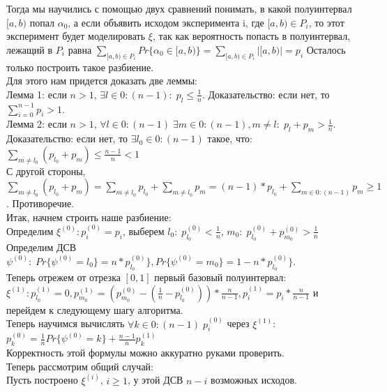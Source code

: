 Тогда мы научились с помощью двух сравнений понимать, в какой полуинтервал $[a, b)$ попал $\alpha_0$, а если объявить исходом эксперимента i, где $[a, b) \in P_i$, то этот эксперимент будет моделировать $\xi$, так как вероятность попасть в полуинтервал, лежащий в $P_i$ равна $\sum\limits_{[a, b) \in P_i}Pr\{\alpha_0 \in [a, b)\} = \sum\limits_{[a, b) \in P_i}|[a, b)| = p_i$ Осталось только построить такое разбиение.\\
Для этого нам придется доказать две леммы:\\
Лемма 1: если $n > 1$, $\exists l \in 0:(n - 1): \; p_l \leq \frac{1}{n}$. Доказательство: если нет, то $\sum\limits_{i = 0}^{n - 1} p_i > 1$.\\
Лемма 2: если $n > 1$, $\forall l \in 0:(n - 1) \; \exists m \in 0:(n - 1), m \not= l : \; p_l + p_m > \frac{1}{n}$. Доказательство: если нет, то $\exists l_0 \in 0:(n - 1)$ такое, что:\\
$\sum\limits_{m \not= l_0} (p_{l_0} + p_m) \leq \frac{n - 1}{n} < 1$\\
С другой стороны, $\sum\limits_{m \not= l_0} (p_{l_0} + p_m) = \sum\limits_{m \not= l_0} p_{l_0} + \sum\limits_{m \not= l_0}p_m = (n - 1) * p_{l_0} + \sum\limits_{m \in 0:(n - 1)}p_m \geq 1$. Противоречие.\\
Итак, начнем строить наше разбиение:\\
Определим $\xi^{(0)}: p^{(0)}_i = p_i$, выберем $l_0: \; p^{(0)}_{l_0} < \frac{1}{n}$, $m_0: \; p^{(0)}_{l_0} + p^{(0)}_{m_0} > \frac{1}{n}$\\
Определим ДСВ $\psi^{(0)}: \; Pr\{\psi^{(0)} = l_0\} = n * p^{(0)}_{l_0}\}, Pr\{\psi^{(0)} = m_0\} = 1 - n * p^{(0)}_{l_0}\}$.\\
Теперь отрежем от отрезка $[0, 1]$ первый базовый полуинтервал:\\
$\xi^{(1)}: p^{(1)}_{l_0} = 0, p^{(1)}_{m_0} = (p^{(0)}_{m_0} - (\frac{1}{n} - p^{(0)}_{l_0})) * \frac{n}{n - 1},  p^{(1)}_i = p_i * \frac{n}{n - 1}$ и перейдем к следующему шагу алгоритма.\\
Теперь научимся вычислять $\forall k \in 0:(n - 1) \; p^{(0)}_i$ через $\xi^{(1)}$:\\
$p^{(0)}_k = \frac{1}{n}Pr\{\psi^{(0)} = k\} + \frac{n - 1}{n}p^{(1)}_k$\\
Корректность этой формулы можно аккуратно руками проверить.\\
Теперь рассмотрим общий случай:\\
Пусть построено $\xi^{(i)}$, $i \geq 1$, у этой ДСВ $n - i$ возможных исходов.\\
